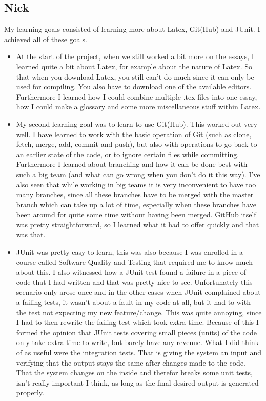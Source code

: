 \documentclass{article}
\begin{document}
\begin{enumerate}
\subsection*{Nick}
My learning goals consisted of learning more about Latex, Git(Hub) and JUnit. I achieved all of these goals.
\begin{itemize}
    \item At the start of the project, when we still worked a bit more on the essays, I learned quite a bit about Latex, for example about the nature of Latex. So that when you download Latex, you still can't do much since it can only be used for compiling. You also have to download one of the available editors.
Furthermore I learned how I could combine multiple .tex files into one essay, how I could make a glossary and some more miscellaneous stuff within Latex.
    \item My second learning goal was to learn to use Git(Hub). This worked out very well. I have learned to work with the basic operation of Git (such as clone, fetch, merge, add, commit and push), but also with operations to go back to an earlier state of the code, or to ignore certain files while committing.
Furthermore I learned about branching and how it can be done best with such a big team (and what can go wrong when you don't do it this way).
I've also seen that while working in big teams it is very inconvenient to have too many branches, since all these branches have to be merged with the master branch which can take up a lot of time, especially when these branches have been around for quite some time without having been merged.
GitHub itself was pretty straightforward, so I learned what it had to offer quickly and that was that.
    \item JUnit was pretty easy to learn, this was also because I was enrolled in a course called Software Quality and Testing that required me to know much about this.
I also witnessed how a JUnit test found a failure in a piece of code that I had written and that was pretty nice to see. Unfortunately this scenario only arose once and in the other cases when JUnit complained about a failing tests, it wasn't about a fault in my code at all, but it had to with the test not expecting my new feature/change. This was quite annoying, since I had to then rewrite the failing test which took extra time.
Because of this I formed the opinion that JUnit tests covering small pieces (units) of the code only take extra time to write, but barely have any revenue. What I did think of as useful were the integration tests. That is giving the system an input and verifying that the output stays the same after changes made to the code. That the system changes on the inside and therefor breaks some unit tests, isn't really important I think, as long as the final desired output is generated properly.
\end{itemize}


\end{enumerate}
\end{document}
